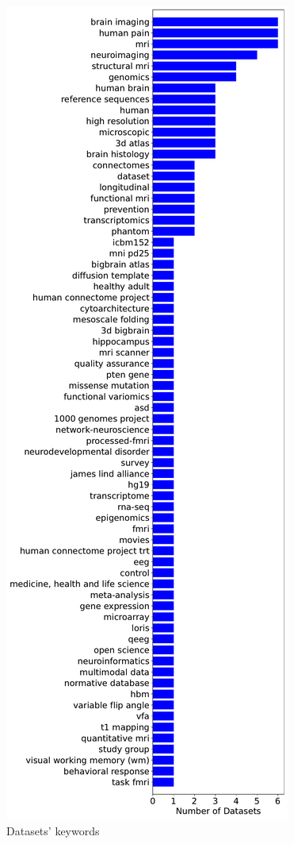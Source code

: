 \begin{figure}
    \centering
    \includegraphics[width=\textwidth,height=\textheight,keepaspectratio]{figures/Datasets Keyword.pdf}
    \caption{Datasets' keywords}
    \label{fig:dataset_keywords}
\end{figure}


